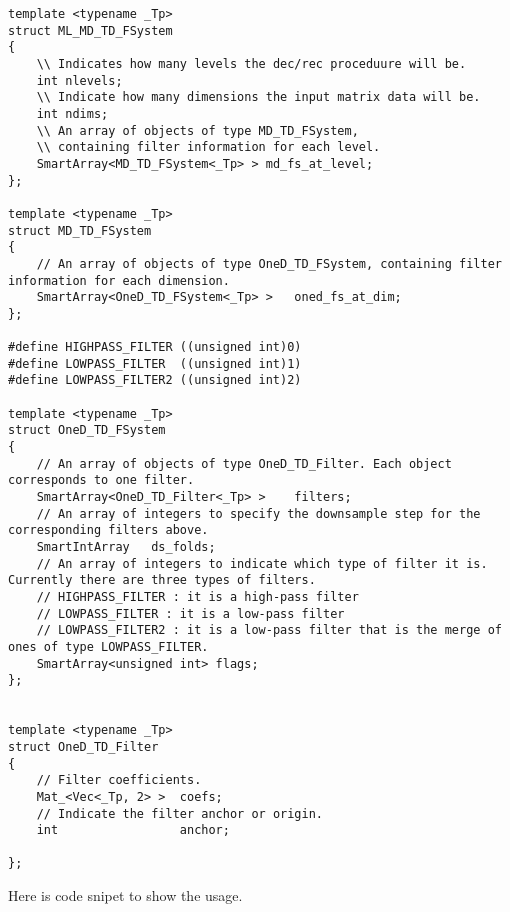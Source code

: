 \documentclass[a4paper,5pt]{article}
\begin{document}
\begin{lstlisting}
template <typename _Tp>
struct ML_MD_TD_FSystem
{
	\\ Indicates how many levels the dec/rec proceduure will be.
	int nlevels;			
	\\ Indicate how many dimensions the input matrix data will be.
	int ndims;          
	\\ An array of objects of type MD_TD_FSystem, 
	\\ containing filter information for each level.
	SmartArray<MD_TD_FSystem<_Tp> > md_fs_at_level;    
};

template <typename _Tp>
struct MD_TD_FSystem
{
    // An array of objects of type OneD_TD_FSystem, containing filter information for each dimension.
	SmartArray<OneD_TD_FSystem<_Tp> >	oned_fs_at_dim;
};

#define HIGHPASS_FILTER ((unsigned int)0)
#define LOWPASS_FILTER  ((unsigned int)1)
#define LOWPASS_FILTER2 ((unsigned int)2)

template <typename _Tp>
struct OneD_TD_FSystem
{
	// An array of objects of type OneD_TD_Filter. Each object corresponds to one filter.
	SmartArray<OneD_TD_Filter<_Tp> >	filters;
	// An array of integers to specify the downsample step for the corresponding filters above.
	SmartIntArray	ds_folds;
	// An array of integers to indicate which type of filter it is. Currently there are three types of filters.
	// HIGHPASS_FILTER : it is a high-pass filter
	// LOWPASS_FILTER : it is a low-pass filter
	// LOWPASS_FILTER2 : it is a low-pass filter that is the merge of ones of type LOWPASS_FILTER.
	SmartArray<unsigned int> flags;
};


template <typename _Tp>
struct OneD_TD_Filter
{
	// Filter coefficients.
	Mat_<Vec<_Tp, 2> > 	coefs;
	// Indicate the filter anchor or origin.
	int 				anchor;

};

\end{lstlisting}

Here is code snipet to show the usage.
\end{document}
